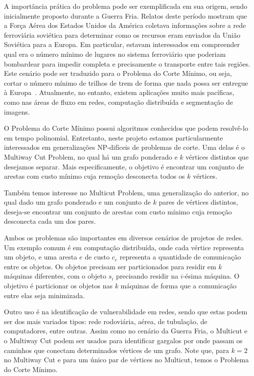 \documentclass[12pt, a4paper]{article}
\begin{document}
A importância prática do problema pode ser exemplificada em sua origem, sendo inicialmente proposto durante a Guerra Fria. Relatos deste período mostram que a Força Aérea dos Estados Unidos da América coletava informações sobre a rede ferroviária soviética para determinar como os recursos eram enviados da União Soviética para a Europa. Em particular, estavam interessados em compreender qual era o número mínimo de lugares no sistema ferroviário que poderiam bombardear para impedir completa e precisamente o transporte entre tais regiões. Este cenário pode ser traduzido para o Problema do Corte Mínimo, ou seja, cortar o número mínimo de trilhos de trem de forma que nada possa ser entregue à Europa~\cite{Schri2002}.
Atualmente, no entanto, existem aplicações muito mais pacíficas, como nas áreas de fluxo em redes, computação distribuída e segmentação de imagens.

O Problema do Corte Mínimo possui algoritmos conhecidos que podem resolvê-lo em tempo polinomial. Entretanto, neste projeto estamos particularmente interessados em generaliza\-ções NP-difíceis de problemas de corte. Uma delas é o Multiway Cut Problem, no qual há um grafo ponderado e $k$ vértices distintos que desejamos separar.
Mais especificamente, o objetivo é encontrar um conjunto de arestas com custo mínimo cuja remoção desconecta todos os $k$ vértices.

Também temos interesse no Multicut Problem, uma generalização do anterior, no qual dado um grafo ponderado e um conjunto de $k$ pares de vértices distintos, deseja-se encontrar um conjunto de arestas com custo mínimo cuja remoção desconecta cada um dos pares.

Ambos os problemas são importantes em diversos cenários de projetos de redes. Um exemplo comum é em computação distribuída, onde cada vértice representa um objeto, e uma aresta $e$ de custo $c_{e}$ representa a quantidade de comunicação entre os objetos. Os objetos precisam ser particionados para residir em $k$ máquinas diferentes, com o objeto $s_{i}$ precisando residir na $i$-ésima máquina. O objetivo é particionar os objetos nas $k$ máquinas de forma que a comunicação entre elas seja minimizada.

Outro uso é na identificação de vulnerabilidade em redes, sendo que estas podem ser dos mais variados tipos: rede rodoviária, aérea, de tubulação, de computadores, entre outras. Assim como no cenário da Guerra Fria, o Multicut e o Multiway Cut podem ser usados para identificar gargalos por onde passam os caminhos que conectam determinados vértices de um grafo. Note que, para $k = 2$ no Multiway Cut e para um único par de vértices no Multicut, temos o Problema do Corte Mínimo.
\end{document}
